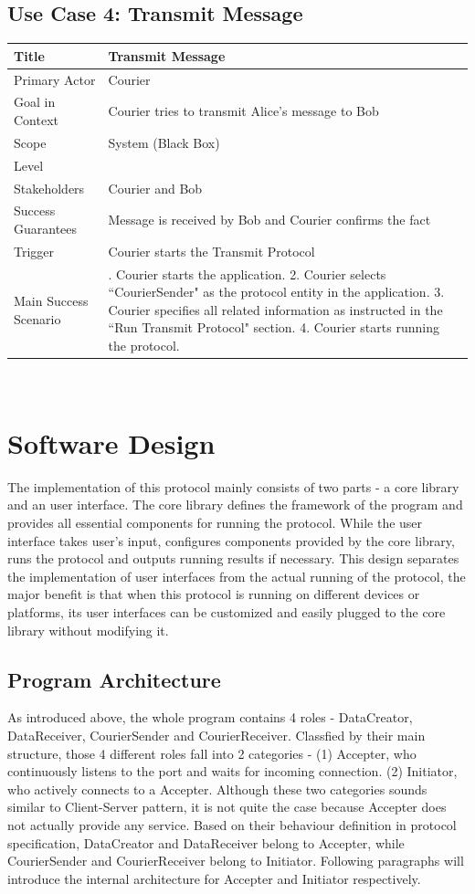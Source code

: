 \subsection*{Use Case 4: Transmit Message}
\begin{tabular}{|l|p{}|}
 \hline
 Title & Transmit Message \\ \hline
 Primary Actor & Courier \\ \hline
 Goal in Context & Courier tries to transmit Alice's message to Bob \\ \hline
 Scope & System (Black Box) \\ \hline
 Level & \\ \hline
 Stakeholders & Courier and Bob\\ \hline
 Success Guarantees & Message is received by Bob and Courier confirms the fact \\ \hline
 Trigger & Courier starts the Transmit Protocol \\ \hline
 Main Success Scenario & 
 \parbox{9cm}{
  . Courier starts the application.
  2. Courier selects ``CourierSender" as the protocol entity in the application.
  3. Courier specifies all related information as instructed in the ``Run Transmit Protocol" section.
  4. Courier starts running the protocol.
  \medskip
 }
 \\ \hline
\end{tabular}
\\

\section{Software Design}
The implementation of this protocol mainly consists of two parts - a core library and an user interface. The core library defines the framework of the program and provides all essential components for running the protocol. While the user interface takes user's input, configures components provided by the core library, runs the protocol and outputs running results if necessary. This design separates the implementation of user interfaces from the actual running of the protocol, the major benefit is that when this protocol is running on different devices or platforms, its user interfaces can be customized and easily plugged to the core library without modifying it.

\subsection{Program Architecture}
As introduced above, the whole program contains 4 roles - DataCreator, DataReceiver, CourierSender and CourierReceiver. Classfied by their main structure, those 4 different roles fall into 2 categories - (1) Accepter, who continuously listens to the port and waits for incoming connection. (2) Initiator, who actively connects to a Accepter. Although these two categories sounds similar to Client-Server pattern, it is not quite the case because Accepter does not actually provide any service. Based on their behaviour definition in protocol specification, DataCreator and DataReceiver belong to Accepter, while CourierSender and CourierReceiver belong to Initiator. Following paragraphs will introduce the internal architecture for Accepter and Initiator respectively.
